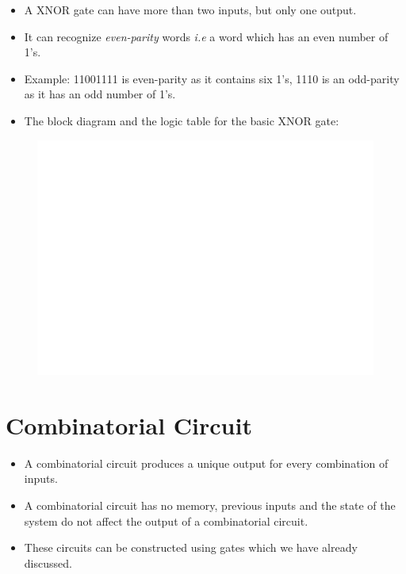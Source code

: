 \documentclass[]{book}
\providecommand{\tightlist}{%
  \setlength{\itemsep}{0pt}\setlength{\parskip}{0pt}}
\begin{document}
\begin{itemize}
\tightlist
\item
  A XNOR gate can have more than two inputs, but only one output.
\item
  It can recognize \emph{even-parity} words \emph{i.e} a word which has an even number of 1's.
\item
  Example: 11001111 is even-parity as it contains six 1's, 1110 is an odd-parity as it has an odd number of 1's.
\item
  The block diagram and the logic table for the basic XNOR gate:
\end{itemize}

\begin{figure}

{\centering \includegraphics[width=1\linewidth]{figure/boxC47-1} 

}

\end{figure}

\hypertarget{combinatorial-circuit}{%
\section{Combinatorial Circuit}\label{combinatorial-circuit}}

\begin{itemize}
\tightlist
\item
  A combinatorial circuit produces a unique output for every combination of inputs.
\item
  A combinatorial circuit has no memory, previous inputs and the state of the system do not affect the output of a combinatorial circuit.
\item
  These circuits can be constructed using gates which we have already discussed.
\end{itemize}
\end{document}
